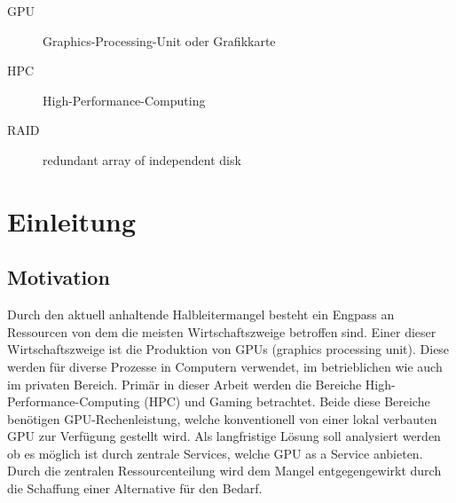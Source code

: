 \documentclass[12pt,toc=bib,toc=listof]{scrreprt}
\title{\topic}
\author{\studentnameA { ({\studentidA)}}, \\ \studentnameB { ({\studentidB)}}, \\ \studentnameC { ({\studentidC)}} }
\date {\semester}
\newcounter{savepage}
\begin{document}
\sffamily
\maketitle

\label{sec:management_summary}



\tableofcontents

\label{sec:abkuerzungsverzeichnis}

\begin{description}
\item[GPU] Graphics-Processing-Unit oder Grafikkarte
\item[HPC] High-Performance-Computing
\item[RAID] redundant array of independent disk
\end{description}


\listoffigures


\newpage

\chapter{Einleitung} %
\label{sec:einleitung}


\section{Motivation} %
\label{sec:motivation}
Durch den aktuell anhaltende Halbleitermangel besteht ein Engpass an Ressourcen von dem die meisten Wirtschaftszweige betroffen sind.
Einer dieser Wirtschaftszweige ist die Produktion von GPUs (graphics processing unit). Diese werden für diverse Prozesse in Computern verwendet, im betrieblichen wie auch im privaten Bereich.
Primär in dieser Arbeit werden die Bereiche High-Performance-Computing (HPC) und Gaming betrachtet.
Beide diese Bereiche benötigen GPU-Rechenleistung, welche konventionell von einer lokal verbauten GPU zur Verfügung gestellt wird. 
Als langfristige Lösung soll analysiert werden ob es möglich ist durch zentrale Services, welche GPU as a Service anbieten. 
Durch die zentralen Ressourcenteilung wird dem Mangel entgegengewirkt durch die Schaffung einer Alternative für den Bedarf.
\end{document}
